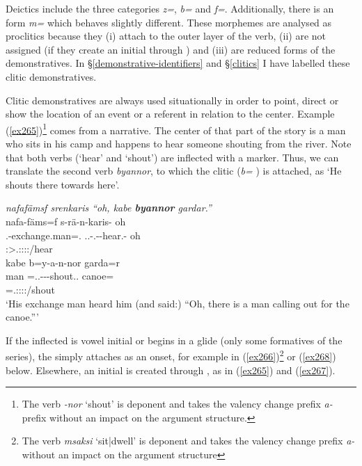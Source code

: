 Deictics include the three categories  \emph{z=},  \emph{b=} and  \emph{f=}. Additionally, there is an  form \emph{m=} which behaves slightly different. These morphemes are analysed as proclitics because they (i) attach to the outer layer of the verb, (ii) are not assigned  (if they create an initial  through ) and (iii) are reduced forms of the demonstratives. In \S{}\ref{demonstrative-identifiers} and \S{}\ref{clitics} I have labelled these clitic demonstratives.%

Clitic demonstratives are always used situationally in order to point, direct or show the location of an event or a referent in relation to the  center. Example (\ref{ex265})\footnote{The verb \emph{-nor} `shout' is deponent and takes the valency change prefix \emph{a-} prefix without an impact on the argument structure.} comes from a narrative. The  center of that part of the story is a man who sits in his camp and happens to hear someone shouting from the river. Note that both verbs (`hear' and `shout') are inflected with a  marker. Thus, we can translate the second verb \emph{byannor}, to which the  clitic  (\emph{b=} \Med) is attached, as `He shouts there towards here'.

\begin{exe}
	\ex \emph{nafafämsf srenkaris ``oh, kabe \textbf{byannor} gardar.''}\\
	\glll nafa-fäms=f s-rä-n-karis-\Zero{} oh\\
	\Third.\Poss-exchange.man=\Erg.\Sg{} \Tsg.\Masc.\Bet-\Irr.\Ndu-\Venit-hear.\Rs-\Stsg{} oh\\
	{} \footnotesize{\Stsg:\Sbj>\Tsg.\Masc:\Obj:\Irr:\Pfv:\Venit/hear} {}\\
	\sn
	\glll kabe b=y-a-n-nor garda=r\\
	man \Med=\Tsg.\Masc.\Alph-\Vc-\Venit-shout.\Ext.\Ndu{} canoe=\Purp{}\\
	{} \footnotesize{\Med=\Tsg.\Masc:\Sbj:\Nonpast:\Ipfv:\Venit/shout} {}\\
	\trans `His exchange man heard him (and said:) ``Oh, there is a man calling out for the canoe.'''
	\label{ex265}
\end{exe}

If the inflected  is vowel initial or begins in a glide (only some formatives of the \Alph{} series), the   simply attaches as an onset, for example in (\ref{ex266})\footnote{The verb \emph{msaksi} `sit|dwell' is deponent and takes the valency change prefix \emph{a-} without an impact on the argument structure} or (\ref{ex268}) below. Elsewhere, an initial  is created through , as in (\ref{ex265}) and (\ref{ex267}).

